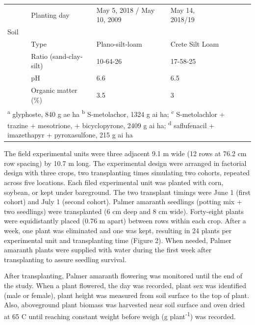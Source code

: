 \documentclass[utf8]{frontiersSCNS}
\begin{document}
\begin{table}[!h]
{\begin{tabular}[t]{lllllll}
\multirow{-6}{*}{\raggedright\arraybackslash } & Planting day & May 5, 2018 / May 10, 2009 & May 14, 2018/19 &  &  & \\

Soil &  &  &  &  &  & \\

 & Type & Plano-silt-loam & Crete Silt Loam &  &  & \\

 & Ratio (sand-clay-silt) & 10-64-26 & 17-58-25 &  &  & \\

 & pH & 6.6 & 6.5 &  &  & \\

\multirow{-4}{*}{\raggedright\arraybackslash } & Organic matter (\%) & 3.5 & 3 &  &  & \\
\bottomrule
\multicolumn{7}{l}{\rule{0pt}{1em}\textsuperscript{a} glyphoste, 840 g ae ha \textsuperscript{b} S-metolachor, 1324 g ai ha; \textsuperscript{c} S-metolachlor + trazine + mesotrione, + bicyclopyrone, 2409 g ai ha; \textsuperscript{d} saflufenacil + imazethapyr + pyroxasulfone, 215 g ai ha}\\
\end{tabular}}
\end{table}

The field experimental units were three adjacent 9.1 m wide (12 rows at
76.2 cm row spacing) by 10.7 m long. The experimental design were
arranged in factorial design with three crops, two transplanting times
simulating two cohorts, repeated across five locations. Each filed
experimental unit was planted with corn, soybean, or kept under
bareground. The two transplant timings were June 1 (first cohort) and
July 1 (second cohort). Palmer amaranth seedlings (potting mix + two
seedlings) were transplanted (6 cm deep and 8 cm wide). Forty-eight
plants were equidistantly placed (0.76 m apart) between rows within each
crop. After a week, one plant was eliminated and one was kept, resulting
in 24 plants per experimental unit and transplanting time (Figure 2).
When needed, Palmer amaranth plants were supplied with water during the
first week after transplanting to assure seedling survival.

After transplanting, Palmer amaranth flowering was monitored until the
end of the study. When a plant flowered, the day was recorded, plant sex
was identified (male or female), plant height was measured from soil
surface to the top of plant. Also, aboveground plant biomass was
harvested near soil surface and oven dried at 65 C until reaching
constant weight before weigh (g plant\textsuperscript{-1}) was recorded.
\end{document}
